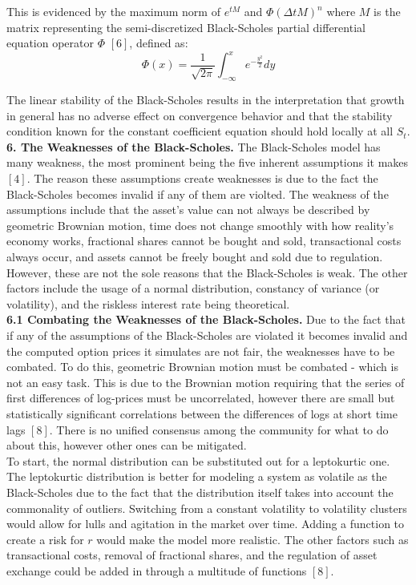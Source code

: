 \documentclass{report}
\begin{document}
	This is evidenced by the maximum norm of $e^{tM}$ and $\Phi(\Delta tM)^n$ where $M$ is the matrix representing the semi-discretized Black-Scholes partial differential equation operator $\Phi$ $[6]$, defined as:
	\\
	\[ \Phi(x) = \frac{1}{\sqrt{2\pi}} \int_{-\infty}^{x} e^{-\frac{y^2}{2}}dy\]
	\vspace{0.1cm}
	
	The linear stability of the Black-Scholes results in the interpretation that growth in general has no adverse effect on convergence behavior and that the stability condition known for the constant coefficient equation should hold locally at all $S_t$.
	\\
	
	\textbf{6. The Weaknesses of the Black-Scholes.} The Black-Scholes model has many weakness, the most prominent being the five inherent assumptions it makes $[4]$. The reason these assumptions create weaknesses is due to the fact the Black-Scholes becomes invalid if any of them are violted. The weakness of the assumptions include that the asset's value can not always be described by geometric Brownian motion, time does not change smoothly with how reality's economy works, fractional shares cannot be bought and sold, transactional costs always occur, and assets cannot be freely bought and sold due to regulation. However, these are not the sole reasons that the Black-Scholes is weak. The other factors include the usage of a normal distribution, constancy of variance (or volatility), and the riskless interest rate being theoretical.
	\\
	
	\textbf{6.1 Combating the Weaknesses of the Black-Scholes.} Due to the fact that if any of the assumptions of the Black-Scholes are violated it becomes invalid and the computed option prices it simulates are not fair, the weaknesses have to be combated. To do this, geometric Brownian motion must be combated - which is not an easy task. This is due to the Brownian motion requiring that the series of first differences of log-prices must be uncorrelated, however there are small but statistically significant correlations between the differences of logs at short time lags $[8]$. There is no unified consensus among the community for what to do about this, however other ones can be mitigated.\\
	
	To start, the normal distribution can be substituted out for a leptokurtic one. The leptokurtic distribution is better for modeling a system as volatile as the Black-Scholes due to the fact that the distribution itself takes into account the commonality of outliers. Switching from a constant volatility to volatility clusters would allow for lulls and agitation in the market over time. Adding a function to create a risk for $r$ would make the model more realistic. The other factors such as transactional costs, removal of fractional shares, and the regulation of asset exchange could be added in through a multitude of functions $[8]$.\\
	
\end{document}
